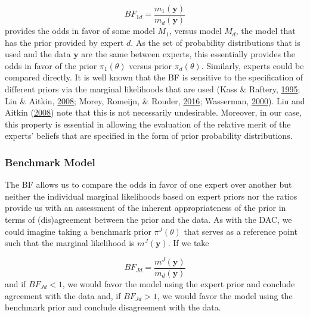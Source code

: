 \documentclass[openright,titlepage,12pt,a4paper]{book}
\begin{document}
\begin{equation} 
BF_{1d} = \frac{m_1(\textbf{y})}{m_d(\textbf{y})}
\label{eq:ch03eq5}
\end{equation}
provides the odds in favor of some model \(M_1\), versus model \(M_d\), the model that has the prior provided by expert \(d\). As the set of probability distributions that is used and the data \(\textbf{y}\) are the same between experts, this essentially provides the odds in favor of the prior \(\pi_1(\theta)\) versus prior \(\pi_d(\theta)\). Similarly, experts could be compared directly. It is well known that the BF is sensitive to the specification of different priors via the marginal likelihoods that are used (Kass \& Raftery, \protect\hyperlink{ref-kass_bayes_1995}{1995}; Liu \& Aitkin, \protect\hyperlink{ref-liu_bayes_2008}{2008}; Morey, Romeijn, \& Rouder, \protect\hyperlink{ref-morey_philosophy_2016}{2016}; Wasserman, \protect\hyperlink{ref-wasserman_bayesian_2000}{2000}). Liu and Aitkin (\protect\hyperlink{ref-liu_bayes_2008}{2008}) note that this is not necessarily undesirable. Moreover, in our case, this property is essential in allowing the evaluation of the relative merit of the experts' beliefs that are specified in the form of prior probability distributions.

\hypertarget{benchmark-model}{%
\subsubsection{Benchmark Model}\label{benchmark-model}}

The BF allows us to compare the odds in favor of one expert over another but neither the individual marginal likelihoods based on expert priors nor the ratios provide us with an assessment of the inherent appropriateness of the prior in terms of (dis)agreement between the prior and the data. As with the DAC, we could imagine taking a benchmark prior \(\pi^J(\theta)\) that serves as a reference point such that the marginal likelihood is \(m^J(\textbf{y})\). If we take

\begin{equation} 
BF_{Jd} = \frac{m^J(\textbf{y})}{m_d(\textbf{y})}
\label{eq:ch03eq6}
\end{equation}
and if \(BF_{Jd} < 1\), we would favor the model using the expert prior and conclude agreement with the data and, if \(BF_{Jd} > 1\), we would favor the model using the benchmark prior and conclude disagreement with the data.
\end{document}
